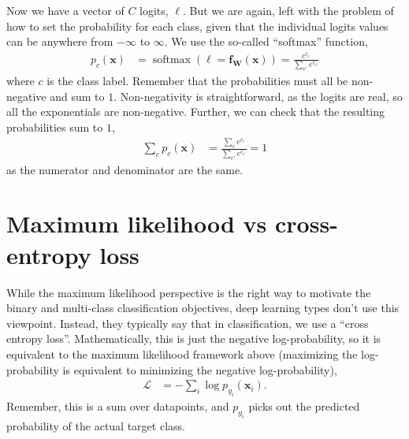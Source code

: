 \documentclass{article}
\newcommand{\bracket}[3]{\left#1 #3 \right#2}
\renewcommand{\b}{\bracket{(}{)}}
\newcommand{\x}{\mathbf{x}}
\newcommand{\f}{\mathbf{f}}
\newcommand{\W}{\mathbf{W}}
\renewcommand{\L}{\mathcal{L}}
\newcommand{\logits}{\ell}
\newcommand{\vlogits}{\boldsymbol{\logits}}
\newcommand{\softmax}{\operatorname{softmax}\b}
\begin{document}
Now we have a vector of $C$ logits, $\vlogits$.
But we are again, left with the problem of how to set the probability for each class, given that the individual logits values can be anywhere from $-\infty$ to $\infty$.
We use the so-called ``softmax'' function,
\begin{align}
  p_c(\x) &= \softmax{\vlogits = \f_{\W}(\x)} = \frac{e^{\logits_c}}{\sum_{c'} e^{\logits_{c'}}}
\end{align}
where $c$ is the class label.
Remember that the probabilities must all be non-negative and sum to $1$.
Non-negativity is straightforward, as the logits are real, so all the exponentials are non-negative.
Further, we can check that the resulting probabilities sum to $1$,
\begin{align}
  \sum_{c} p_c(\x) &= \frac{\sum_c e^{\logits_c}}{\sum_{c'} e^{\logits_{c'}}} = 1
\end{align}
as the numerator and denominator are the same.

\section{Maximum likelihood vs cross-entropy loss}

While the maximum likelihood perspective is the right way to motivate the binary and multi-class classification objectives, deep learning types don't use this viewpoint.
Instead, they typically say that in classification, we use a ``cross entropy loss''.
Mathematically, this is just the negative log-probability, so it is equivalent to the maximum likelihood framework above (maximizing the log-probability is equivalent to minimizing the negative log-probability),
\begin{align}
  \L &= - \sum_i \log p_{y_i}(\x_i).
\end{align}
Remember, this is a sum over datapoints, and $p_{y_i}$ picks out the predicted probability of the actual target class.
\end{document}
